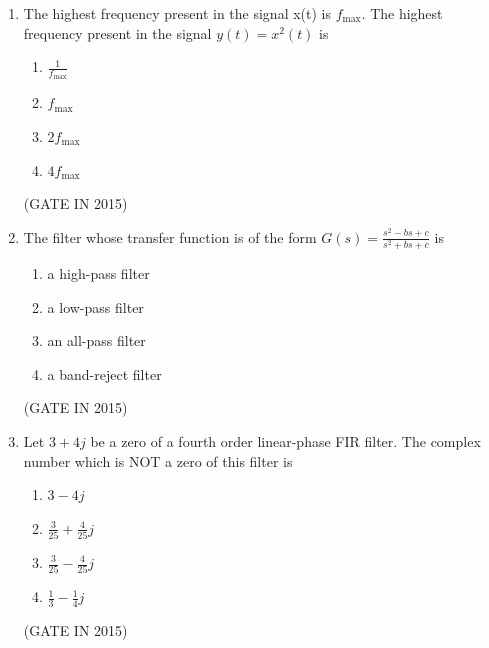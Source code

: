 \documentclass[journal]{IEEEtran}
\begin{document}
\begin{enumerate}
\item The highest frequency present in the signal x(t) is $f_{\max}$. The highest frequency present in the signal $y(t) = x^2(t)$ is

\begin{multicols}{4}
\begin{enumerate}
\item $\frac{1}{f_{\text{max}}}$
\item $f_{\text{max}}$
\item $2f_{\text{max}}$
\item $4f_{\text{max}}$
\end{enumerate}
  \end{multicols} \hfill(GATE IN 2015)

\item The filter whose transfer function is of the form $G(s) = \frac{s^2 - bs + c}{s^2 + bs + c}$ is

\begin{multicols}{2}
\begin{enumerate}
\item a high-pass filter
\item a low-pass filter
\item an all-pass filter
\item a band-reject filter
\end{enumerate}
  \end{multicols} \hfill(GATE IN 2015)

\item Let $3 + 4j$ be a zero of a fourth order linear-phase FIR filter. The complex number which is NOT a zero of this filter is

\begin{multicols}{4}
\begin{enumerate}
\item $3-4j$
\item $\frac{3}{25} + \frac{4}{25}j$
\item $\frac{3}{25} - \frac{4}{25}j$
\item $\frac{1}{3} - \frac{1}{4}j$
\end{enumerate}
  \end{multicols} \hfill(GATE IN 2015)


\end{enumerate}
\end{document}
